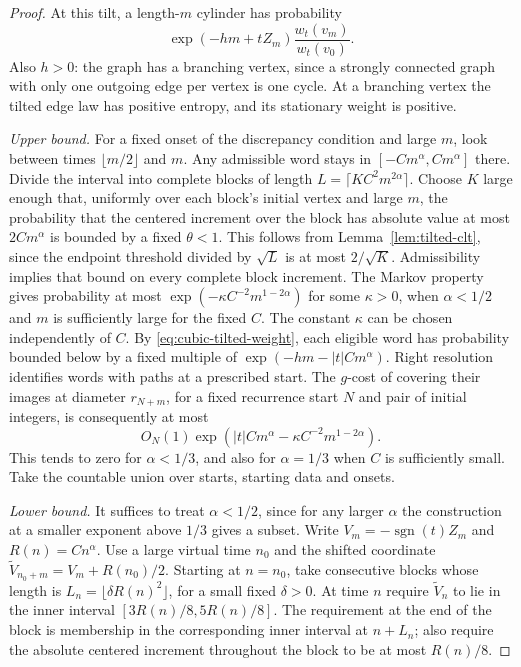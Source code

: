 \documentclass[11pt]{article}
\theoremstyle{definition}
\theoremstyle{remark}
\begin{document}
\begin{proof}
At this tilt, a length-$m$ cylinder has probability
\begin{equation}
 \exp(-hm+tZ_m)\frac{w_t(v_m)}{w_t(v_0)} .
 \label{eq:cubic-tilted-weight}
\end{equation}
Also $h>0$: the graph has a branching vertex, since a strongly
connected graph with only one outgoing edge per vertex is one
cycle. At a branching vertex the tilted edge law has positive
entropy, and its stationary weight is positive.

\emph{Upper bound.}
For a fixed onset of the discrepancy condition and large $m$,
look between times $\lfloor m/2\rfloor$ and $m$.
Any admissible word stays in $[-Cm^\alpha,Cm^\alpha]$ there.
Divide the interval into complete blocks of length
$L=\lceil K C^2m^{2\alpha}\rceil$. Choose $K$ large enough that,
uniformly over each block's initial vertex and large $m$, the
probability that the centered increment over the block has absolute
value at most $2Cm^\alpha$ is bounded by a fixed $\theta<1$.
This follows from Lemma~\ref{lem:tilted-clt}, since the endpoint
threshold divided by $\sqrt L$ is at most $2/\sqrt K$.
Admissibility implies that bound on every complete block increment.
The Markov property gives probability at most
$\exp(-\kappa C^{-2}m^{1-2\alpha})$ for some $\kappa>0$,
when $\alpha<1/2$ and $m$ is sufficiently large for the fixed
$C$. The constant $\kappa$ can be chosen independently of $C$.
By \eqref{eq:cubic-tilted-weight}, each eligible word has
probability bounded below by a fixed multiple of
$\exp(-hm-|t|Cm^\alpha)$. Right resolution identifies words
with paths at a prescribed start. The $g$-cost of covering their
images at diameter $r_{N+m}$, for a fixed recurrence start $N$
and pair of initial integers, is consequently at most
\[
 O_N(1)\exp\!\left(|t|Cm^\alpha
                    -\kappa C^{-2}m^{1-2\alpha}\right).
\]
This tends to zero for $\alpha<1/3$, and also for $\alpha=1/3$
when $C$ is sufficiently small. Take the countable union over
starts, starting data and onsets.

\emph{Lower bound.}
It suffices to treat $\alpha<1/2$,
since for any larger $\alpha$ the construction at a smaller
exponent above $1/3$ gives a subset. Write
$V_m=-\operatorname{sgn}(t)Z_m$ and $R(n)=Cn^\alpha$.
Use a large virtual time $n_0$ and the shifted coordinate
$\widetilde V_{n_0+m}=V_m+R(n_0)/2$.
Starting at $n=n_0$, take consecutive blocks whose length is
$L_n=\lfloor\delta R(n)^2\rfloor$, for a small fixed
$\delta>0$. At time $n$ require $\widetilde V_n$ to lie in
the inner interval
$[3R(n)/8,5R(n)/8]$. The requirement at the end of the block
is membership in the corresponding inner interval at $n+L_n$;
also require the absolute centered increment throughout the
block to be at most $R(n)/8$.


\end{proof}
\end{document}
